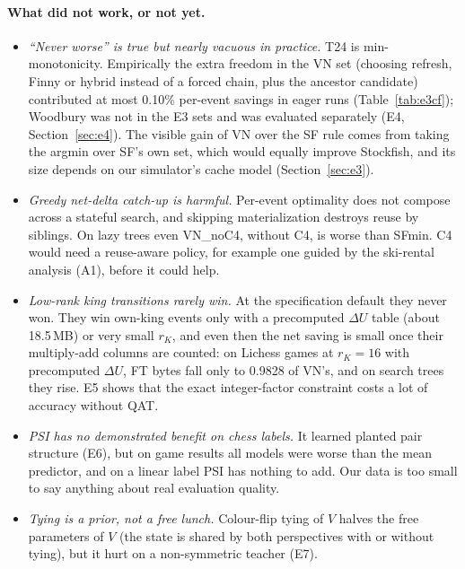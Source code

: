 \paragraph{What did not work, or not yet.}
\begin{itemize}[leftmargin=*,itemsep=2pt]
\item \emph{``Never worse'' is true but nearly vacuous in practice.}
T24 is min-monotonicity.
Empirically the extra freedom in the VN set (choosing refresh, Finny or hybrid instead of a forced chain, plus the ancestor candidate) contributed at most 0.10\% per-event savings in eager runs (Table~\ref{tab:e3cf}); Woodbury was not in the E3 sets and was evaluated separately (E4, Section~\ref{sec:e4}).
The visible gain of VN over the SF rule comes from taking the argmin over SF's own set, which would equally improve Stockfish, and its size depends on our simulator's cache model (Section~\ref{sec:e3}).
\item \emph{Greedy net-delta catch-up is harmful.}
Per-event optimality does not compose across a stateful search, and skipping materialization destroys reuse by siblings.
On lazy trees even VN\_noC4, without C4, is worse than SFmin.
C4 would need a reuse-aware policy, for example one guided by the ski-rental analysis (A1), before it could help.
\item \emph{Low-rank king transitions rarely win.}
At the specification default they never won.
They win own-king events only with a precomputed $\Delta U$ table (about 18.5\,MB) or very small $r_K$, and even then the net saving is small once their multiply-add columns are counted: on Lichess games at $r_K=16$ with precomputed $\Delta U$, FT bytes fall only to 0.9828 of VN's, and on search trees they rise.
E5 shows that the exact integer-factor constraint costs a lot of accuracy without QAT.
\item \emph{PSI has no demonstrated benefit on chess labels.}
It learned planted pair structure (E6), but on game results all models were worse than the mean predictor, and on a linear label PSI has nothing to add.
Our data is too small to say anything about real evaluation quality.
\item \emph{Tying is a prior, not a free lunch.}
Colour-flip tying of $V$ halves the free parameters of $V$ (the state is shared by both perspectives with or without tying), but it hurt on a non-symmetric teacher (E7).
\end{itemize}

